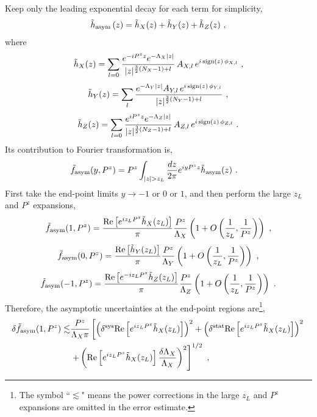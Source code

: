 \documentclass[a4paper,11pt]{article}
\begin{document}
Keep only the leading exponential decay for each term for simplicity,
\begin{align}
\tilde{h}_{\rm asym}\left(z\right) = 
\tilde{h}_{X}(z)  + \tilde{h}_{Y}(z) 
+ \tilde{h}_{Z}(z)  \ ,
\end{align}
where 
\begin{align}
\tilde{h}_{X}(z)  =  \sum_{l=0} \frac{e^{-i P^z z} e^{-\Lambda_X |z| }}{|z|^{\frac{3}{2}(N_X-1)+l}} \, A_{X,l} \, e^{i \, {\rm sign}(z) \, \phi_{X,l}}   \ ,
\end{align}
\begin{align}
\tilde{h}_{Y}(z) = \sum_{l} \frac{e^{-\Lambda_Y |z|} A_{Y,l} \, e^{i \, {\rm sign}(z) \, \phi_{Y,l}}}{|z|^{\frac{3}{2}(N_Y-1)+l}}  \ ,
\end{align}
\begin{align}
\tilde{h}_{Z}(z) =  \sum_{l=0} \frac{e^{i P^z z} e^{-\Lambda_Z |z|}}{|z|^{\frac{3}{2}(N_Z-1)+l}} \, A_{Z,l} \, e^{i \, {\rm sign}(z) \, \phi_{Z,l}}   \ .
\end{align}
Its contribution to Fourier transformation is,
\begin{align}
&\tilde f_{\rm asym}(y,P^z) = P^z \int_{|z|>z_L} \frac{d z}{2\pi} e^{i y P^z z} \tilde{h}_{\rm asym}(z)  \ .
\end{align}
First take the end-point limits $y \rightarrow -1$ or $0$ or $1$, and then perform the large $z_L$ and $P^z$ expansions,
\begin{align}
\tilde f_{\rm asym}(1,P^z)  = \frac{{\rm Re}\left[e^{i z_L P^z}\tilde{h}_{X}(z_L)\right]}{\pi} \frac{P^z}{\Lambda_X} \left(1+O\left(\frac{1}{z_L},\frac{1}{P^z}\right)\right) \ ,
\end{align}
\begin{align}
\tilde f_{\rm asym}(0,P^z)  = \frac{{\rm Re}\left[\tilde{h}_{Y}(z_L)\right]}{\pi} \frac{P^z}{\Lambda_Y} \left(1+O\left(\frac{1}{z_L},\frac{1}{P^z}\right)\right) \ ,
\end{align}
\begin{align}
\tilde f_{\rm asym}(-1,P^z)  = \frac{{\rm Re}\left[ e^{-i z_L P^z}\tilde{h}_{Z}(z_L)\right]}{\pi} \frac{P^z}{\Lambda_Z} \left(1+O\left(\frac{1}{z_L},\frac{1}{P^z}\right)\right)  \ .
\end{align}
Therefore, the asymptotic uncertainties at the end-point regions are\footnote{The symbol ``$\lesssim$" means the power corrections in the large $z_L$ and $P^z$ expansions are omitted in the error estimate.},
\begin{align}
\delta\tilde f_{\rm asym}(1,P^z)  \lesssim  &\frac{P^z}{\Lambda_X \pi} \left[ \left(\delta^{\rm sys}{\rm Re}\left[e^{i z_L P^z}\tilde{h}_{X}(z_L)\right]\right)^2 + \left(\delta^{\rm stat}{\rm Re}\left[e^{i z_L P^z}\tilde{h}_{X}(z_L)\right]\right)^2 \right.\nonumber\\
&\left. + \left({\rm Re}\left[e^{i z_L P^z}\tilde{h}_{X}(z_L)\right]\frac{\delta \Lambda_{X}}{\Lambda_{X}}\right)^2 \right]^{1/2} \ ,
\end{align}
\end{document}
